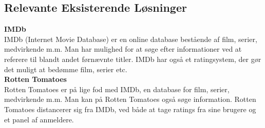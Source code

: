 \subsection{Relevante Eksisterende Løsninger}
\textbf{IMDb} \\
IMDb (Internet Movie Database) er en online database bestående af film, serier, medvirkende m.m. Man har mulighed for at søge efter informationer ved at referere til blandt andet førnævnte titler. IMDb har også et ratingsystem, der gør det muligt at bedømme film, serier etc.\\
\textbf{Rotten Tomatoes} \\
Rotten Tomatoes er på lige fod med IMDb, en database for film, serier, medvirkende m.m. Man kan på Rotten Tomatoes også søge information. Rotten Tomatoes distancerer sig fra IMDb, ved både at tage ratings fra sine brugere og et panel af anmeldere. 